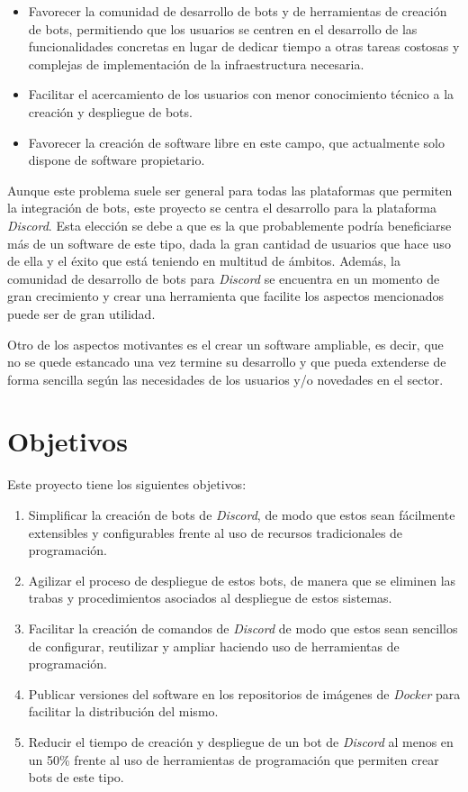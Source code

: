 \begin{itemize}
	\item Favorecer la comunidad de desarrollo de bots y de herramientas de creación de bots, permitiendo que los usuarios se centren en el desarrollo de las funcionalidades concretas en lugar de dedicar tiempo a otras tareas costosas y complejas de implementación de la infraestructura necesaria.
	\item Facilitar el acercamiento de los usuarios con menor conocimiento técnico a la creación y despliegue de bots.
	\item Favorecer la creación de software libre en este campo, que actualmente solo dispone de software propietario.
\end{itemize}

Aunque este problema suele ser general para todas las plataformas que permiten la integración de bots, este proyecto se centra el desarrollo para la plataforma \textit{Discord}. Esta elección se debe a que es la que probablemente podría beneficiarse más de un software de este tipo, dada la gran cantidad de usuarios que hace uso de ella y el éxito que está teniendo en multitud de ámbitos. Además, la  comunidad de desarrollo de bots para \textit{Discord} se encuentra en un momento de gran crecimiento y crear una herramienta que facilite los aspectos mencionados puede ser de gran utilidad.

Otro de los aspectos motivantes es el crear un software ampliable, es decir, que no se quede estancado una vez termine su desarrollo y que pueda extenderse de forma sencilla según las necesidades de los usuarios y/o novedades en el sector.



\section{Objetivos}

Este proyecto tiene los siguientes objetivos:

\begin{enumerate}
	\item Simplificar la creación de bots de \textit{Discord}, de modo que estos sean fácilmente extensibles y configurables frente al uso de recursos tradicionales de programación.
	\item Agilizar el proceso de despliegue de estos bots, de manera que se eliminen las trabas y procedimientos asociados al despliegue de estos sistemas.
	\item Facilitar la creación de comandos de \textit{Discord} de modo que estos sean sencillos de configurar, reutilizar y ampliar haciendo uso de herramientas de programación.
	\item Publicar versiones del software en los repositorios de imágenes de \textit{Docker} para facilitar la distribución del mismo.
	\item Reducir el tiempo de creación y despliegue de un bot de \textit{Discord} al menos en un 50\% frente al uso de herramientas de programación que permiten crear bots de este tipo.
\end{enumerate}




